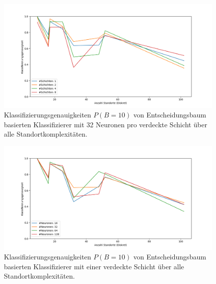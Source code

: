 \begin{figure}[h!]
    \centering
    \includegraphics[width=\linewidth]{images/multiple_best_by_group_knn_layers_acc_10_cont.png}
    \caption{Klassifizierungsgenauigkeiten $P(B=10)$ von Entscheidungsbaum basierten Klassifizierer mit 32 Neuronen pro verdeckte Schicht über alle Standortkomplexitäten.}
    \label{fig:multiple_best_by_group_knn_layers_acc_10_cont}
\end{figure}

\begin{figure}[h!]
    \centering
    \includegraphics[width=\linewidth]{images/multiple_best_by_group_knn_neurons_acc_10_cont.png}
    \caption{Klassifizierungsgenauigkeiten $P(B=10)$ von Entscheidungsbaum basierten Klassifizierer mit einer verdeckte Schicht über alle Standortkomplexitäten.}
    \label{fig:multiple_best_by_group_knn_neurons_acc_10_cont}
\end{figure}